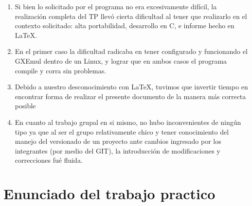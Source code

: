 \documentclass[a4paper,10pt]{article}
\begin{document}
\begin{enumerate}
\item Si bien lo solicitado por el programa no era excesivamente difícil,
la realización completa del TP llevó cierta dificultad al tener que
realizarlo en el contexto solicitado: alta portabilidad, desarrollo
en C, e informe hecho en LaTeX. 
\item En el primer caso la dificultad radicaba en tener configurado 
y funcionando el GXEmul dentro de un Linux, y lograr que en ambos casos 
el programa compile y corra sin problemas. 
\item Debido a nuestro desconocimiento con LaTeX, tuvimos que 
invertir tiempo en encontrar forma de realizar el presente documento 
de la manera más correcta posible 
\item En cuanto al trabajo grupal en si mismo, no hubo inconvenientes de
ningún tipo ya que al ser el grupo relativamente chico y tener conocimiento
del manejo del versionado de un proyecto ante cambios ingresado por
los integrantes (por medio del GIT), la introducción de modificaciones
y correcciones fué fluida. 
\end{enumerate}

\newpage
\section{{\normalsize Enunciado del trabajo practico}}

	



\nocite{*}
\end{document}
